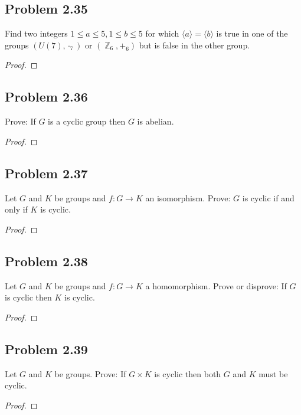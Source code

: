 \documentclass{amsbook}
\newcommand{\pid}[1]{\langle #1 \rangle}
\DeclareMathOperator{\Z}{\mathbb{Z}}
\begin{document}
			\subsection*{Problem 2.35}
			\label{sub:problem_2_35}
			Find two integers $1 \leq a \leq 5, 1 \leq b \leq 5$ for which $\pid{a} = \pid{b}$ is true in one of the groups $(U(7),\cdot_{7})$ or $(\Z_{6},+_{6})$ but is false in the other group.
			\begin{proof}
			\end{proof}

			\subsection*{Problem 2.36}
			\label{sub:problem_2_36}
			Prove: If $G$ is a cyclic group then $G$ is abelian.
			\begin{proof}
			\end{proof}

			\subsection*{Problem 2.37}
			\label{sub:problem_2_37}
			Let $G$ and $K$ be groups and $f : G \to K$ an isomorphism. 
			Prove: $G$ is cyclic if and only if $K$ is cyclic.
			\begin{proof}
			\end{proof}

			\subsection*{Problem 2.38}
			\label{sub:problem_2_38}
			Let $G$ and $K$ be groups and $f : G \to K$ a homomorphism. 
			Prove or disprove: If $G$ is cyclic then $K$ is cyclic.
			\begin{proof}
			\end{proof}

			\subsection*{Problem 2.39}
			\label{sub:problem_2_39}
			Let $G$ and $K$ be groups. 
			Prove: If $G \times K$ is cyclic then both $G$ and $K$ must be cyclic.
			\begin{proof}
			\end{proof}
\end{document}
